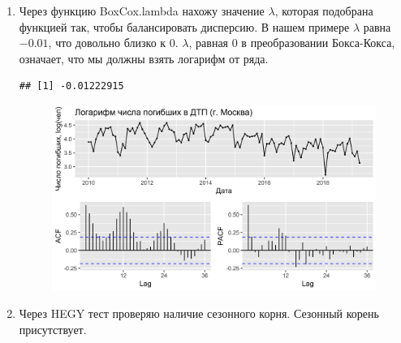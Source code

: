 \documentclass[14pt, a4paper]{extarticle}\usepackage[]{graphicx}\usepackage[]{color}
\makeatletter
\def\maxwidth{ %
  \ifdim\Gin@nat@width>\linewidth
    \linewidth
  \else
    \Gin@nat@width
  \fi
}
\newenvironment{kframe}{%
 \def\at@end@of@kframe{}%
 \ifinner\ifhmode%
  \def\at@end@of@kframe{\end{minipage}}%
  \begin{minipage}{\columnwidth}%
 \fi\fi%
 \def\FrameCommand##1{\hskip\@totalleftmargin \hskip-\fboxsep
 \colorbox{shadecolor}{##1}\hskip-\fboxsep
     \hskip-\linewidth \hskip-\@totalleftmargin \hskip\columnwidth}%
 \MakeFramed {\advance\hsize-\width
   \@totalleftmargin\z@ \linewidth\hsize
   \@setminipage}}%
 {\par\unskip\endMakeFramed%
 \at@end@of@kframe}
\newenvironment{knitrout}{}{} %
\makeatother
\begin{document}
\begin{enumerate}

\item Через функцию BoxCox.lambda нахожу значение $\lambda$, которая подобрана функцией так, чтобы балансировать дисперсию. В нашем примере $\lambda$  равна $-0.01$, что довольно близко к $0$. $\lambda$, равная $0$ в преобразовании Бокса-Кокса, означает, что мы должны взять логарифм от ряда. 

\begin{knitrout}
\color{fgcolor}\begin{kframe}
\begin{verbatim}
## [1] -0.01222915
\end{verbatim}
\end{kframe}
\end{knitrout}

\begin{figure} [H]
\begin{knitrout}
\color{fgcolor}

{\centering \includegraphics[width=\maxwidth]{figure/unnamed-chunk-5-1} 

}



\end{knitrout}
\end{figure}

\item Через HEGY тест проверяю наличие сезонного корня. Сезонный корень присутствует.


\end{enumerate}
\end{document}
